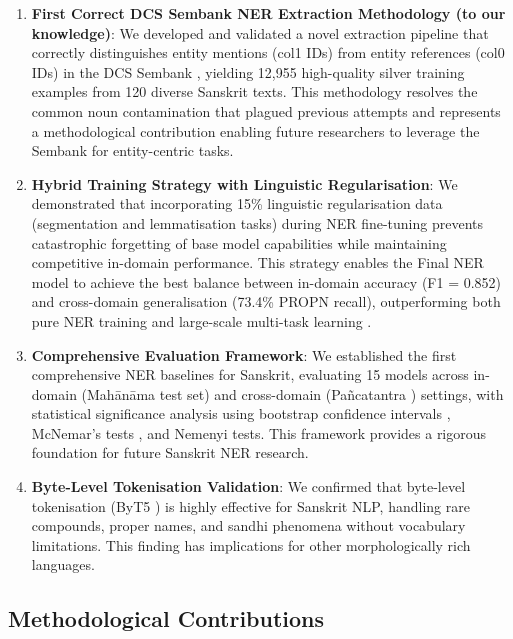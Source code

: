 \begin{enumerate}
    \item \textbf{First Correct DCS Sembank NER Extraction Methodology (to our knowledge)}: We developed and validated a novel extraction pipeline that correctly distinguishes entity mentions (col1 IDs) from entity references (col0 IDs) in the DCS Sembank \cite{hellwig2010dcs, hellwig2025sembank}, yielding 12,955 high-quality silver training examples from 120 diverse Sanskrit texts. This methodology resolves the common noun contamination that plagued previous attempts and represents a methodological contribution enabling future researchers to leverage the Sembank for entity-centric tasks.

    \item \textbf{Hybrid Training Strategy with Linguistic Regularisation}: We demonstrated that incorporating 15\% linguistic regularisation data (segmentation and lemmatisation tasks) during NER fine-tuning prevents catastrophic forgetting \cite{mccloskey1989catastrophic, goodfellow2013empirical} of base model capabilities while maintaining competitive in-domain performance. This strategy enables the Final NER model to achieve the best balance between in-domain accuracy (F1 = 0.852) and cross-domain generalisation (73.4\% PROPN recall), outperforming both pure NER training and large-scale multi-task learning \cite{caruana1997multitask}.

    \item \textbf{Comprehensive Evaluation Framework}: We established the first comprehensive NER baselines for Sanskrit, evaluating 15 models across in-domain (Mah\={a}n\={a}ma \cite{sarkar2025mahanama} test set) and cross-domain (Pa\~{n}catantra \cite{zeman2023ud}) settings, with statistical significance analysis using bootstrap confidence intervals \cite{efron1994bootstrap}, McNemar's tests \cite{mcnemar1947note}, and Nemenyi tests. This framework provides a rigorous foundation for future Sanskrit NER research.

    \item \textbf{Byte-Level Tokenisation Validation}: We confirmed that byte-level tokenisation (ByT5 \cite{xue2022byt5}) is highly effective for Sanskrit NLP, handling rare compounds, proper names, and sandhi phenomena without vocabulary limitations. This finding has implications for other morphologically rich languages.
\end{enumerate}

\subsection{Methodological Contributions}


